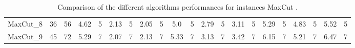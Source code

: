 \begin{sidewaystable}[!ht]
{\begin{tabular}{lcccccccccccccccccccc}
MaxCut\_8 & 36 & 56 & 4.62 & 5 & 2.13 & 5 &  \textcolor{blue2}{2.05} & 5 & 5.0 & 5 & 2.79 & 5 & 3.11 & 5 & 5.29 & 5 & 4.83 & 5 & 5.52 & 5 \\
MaxCut\_9 & 45 & 72 & 5.29 & 7 &  \textcolor{blue2}{2.07} & 7 & 2.13 & 7 & 5.33 & 7 & 3.13 & 7 & 3.42 & 7 & 6.15 & 7 & 5.21 & 7 & 6.47 & 7 \\
\bottomrule
\end{tabular}
}%
\caption{Comparison of the different algorithms performances for instances MaxCut .}
\label{tab:table_compare_MaxCut }
\end{sidewaystable}
